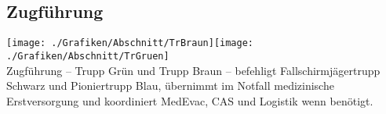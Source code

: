 \subsection{Zugführung}
\texttt{[image: ./Grafiken/Abschnitt/TrBraun]}\quad\texttt{[image: ./Grafiken/Abschnitt/TrGruen]}\\
Zugführung -- Trupp Grün und Trupp Braun -- befehligt Fallschirmjägertrupp Schwarz und Pioniertrupp Blau, übernimmt im Notfall medizinische Erstversorgung und koordiniert \ac{MedEvac}, \ac{CAS} und Logistik wenn benötigt. 